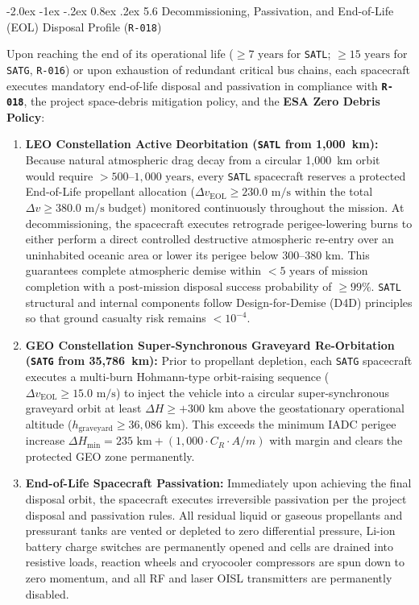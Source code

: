 \documentclass[11pt,a4paper]{article}
\makeatletter
\renewcommand\subsubsection{\@startsection{subsubsection}{3}{\z@}%
    {-2.0ex \@plus -1ex \@minus -.2ex}%
    {0.8ex \@plus .2ex}%
    {\normalfont\normalsize\bfseries\sffamily\color{SubHeadingBlue}}}
\providecommand{\abbr}[1]{#1}
\makeatother
\begin{document}
\subsubsection{5.6 Decommissioning, Passivation, and End-of-Life (EOL) Disposal Profile (\texttt{R-018})}

Upon reaching the end of its operational life ($\ge 7\text{ years}$ for \texttt{SATL}; $\ge 15\text{ years}$ for \texttt{SATG}, \texttt{R-016}) or upon exhaustion of redundant critical bus chains, each spacecraft executes mandatory end-of-life disposal and passivation in compliance with \textbf{\texttt{R-018}}, the project space-debris mitigation policy, and the \textbf{ESA Zero Debris Policy}:
\begin{enumerate}
    \item \textbf{\abbr{LEO} Constellation Active Deorbitation (\texttt{SATL} from 1,000~km):} Because natural atmospheric drag decay from a circular 1,000~km orbit would require $> 500\text{--}1{,}000\text{ years}$, every \texttt{SATL} spacecraft reserves a protected End-of-Life propellant allocation ($\Delta v_{\text{EOL}} \ge 230.0\text{ m/s}$ within the total $\Delta v \ge 380.0\text{ m/s}$ budget) monitored continuously throughout the mission. At decommissioning, the spacecraft executes retrograde perigee-lowering burns to either perform a direct controlled destructive atmospheric re-entry over an uninhabited oceanic area or lower its perigee below $300\text{--}380\text{ km}$. This guarantees complete atmospheric demise within $< 5\text{ years}$ of mission completion with a post-mission disposal success probability of $\ge 99\%$. \texttt{SATL} structural and internal components follow Design-for-Demise (\abbr{D4D}) principles so that ground casualty risk remains $< 10^{-4}$.
    \item \textbf{\abbr{GEO} Constellation Super-Synchronous Graveyard Re-Orbitation (\texttt{SATG} from 35,786~km):} Prior to propellant depletion, each \texttt{SATG} spacecraft executes a multi-burn Hohmann-type orbit-raising sequence ($\Delta v_{\text{EOL}} \ge 15.0\text{ m/s}$) to inject the vehicle into a circular super-synchronous graveyard orbit at least $\Delta H \ge +300\text{ km}$ above the geostationary operational altitude ($h_{\text{graveyard}} \ge 36{,}086\text{ km}$). This exceeds the minimum IADC perigee increase $\Delta H_{\min} = 235\text{ km} + (1{,}000 \cdot C_R \cdot A/m)$ with margin and clears the protected \abbr{GEO} zone permanently.
    \item \textbf{End-of-Life Spacecraft Passivation:} Immediately upon achieving the final disposal orbit, the spacecraft executes irreversible passivation per the project disposal and passivation rules. All residual liquid or gaseous propellants and pressurant tanks are vented or depleted to zero differential pressure, $\mathrm{Li\text{-}ion}$ battery charge switches are permanently opened and cells are drained into resistive loads, reaction wheels and cryocooler compressors are spun down to zero momentum, and all \abbr{RF} and laser \abbr{OISL} transmitters are permanently disabled.
\end{enumerate}
\end{document}
